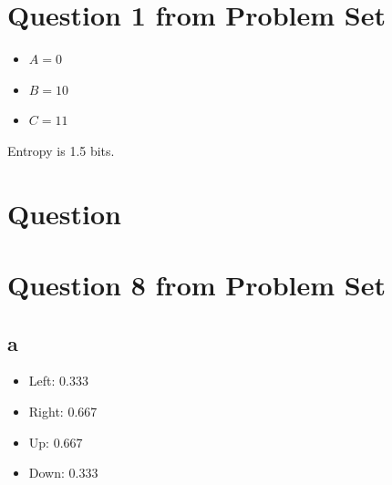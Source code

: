 \documentclass{article}
\begin{document}
    \section{Question 1 from Problem Set}
    \begin{itemize}
        \item $A = 0$
        \item $B = 10$
        \item $C = 11$
    \end{itemize}
    Entropy is 1.5 bits.
    
    \section{Question }

    \section{Question 8 from Problem Set}

    \subsection{a}
    \begin{itemize}
        \item Left: 0.333
        \item Right: 0.667
        \item Up: 0.667
        \item Down: 0.333
    \end{itemize}
\end{document}
